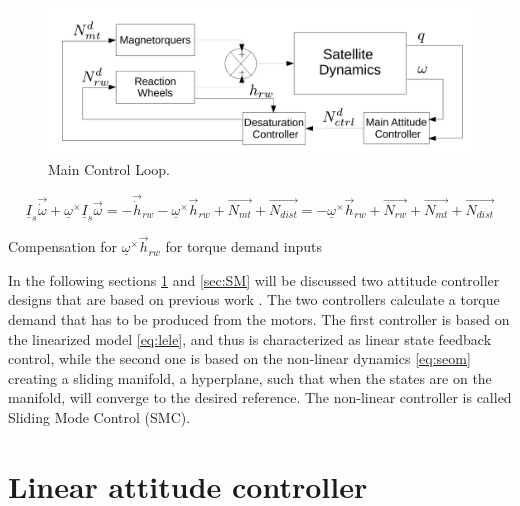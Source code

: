 \begin{figure}[h!]
	\centering 
	\includegraphics[width=160mm]{figures/mainLoop.pdf}	
	\caption{Main Control Loop.}
	\label{fig:mainLoop}
\end{figure}


		\begin{equation}
		\underline{I}_{s}\vec{\dot{\omega}} + \underline{\omega}^\times\underline{I}_{s}\vec{\omega} = -\vec{\dot{h}}_{rw} -  \underline{\omega}^\times \vec{{h}}_{rw} + \vec{N_{mt}}  + \vec{N_{dist}} =  -  \underline{\omega}^\times \vec{{h}}_{rw} + \vec{N_{rw}} + \vec{N_{mt}}  + \vec{N_{dist}} 
		\end{equation}
		
		Compensation for $\underline{\omega}^\times \vec{{h}}_{rw}$ for torque demand inputs  





In the following sections \ref{sec:LC} and \ref{sec:SM}  will be discussed two attitude controller designs that are based on previous work \cite{PrevPro}. The two controllers calculate a torque demand that has to be produced from the motors. The first controller is based on the linearized model \eqref{eq:lele}, and thus is characterized as linear state feedback control, while the second one is based on the non-linear dynamics \eqref{eq:seom} creating a sliding manifold, a hyperplane, such that when the states are on the manifold, will converge to the desired reference. The non-linear controller is called Sliding Mode Control (SMC).

\section{Linear attitude controller} \label{sec:LC}

